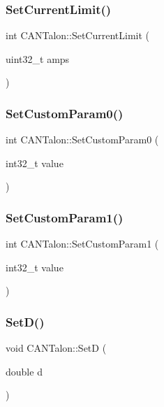 \subsubsection{\texorpdfstring{Set\+Current\+Limit()}{SetCurrentLimit()}}
{\footnotesize\ttfamily int C\+A\+N\+Talon\+::\+Set\+Current\+Limit (\begin{DoxyParamCaption}\item[{uint32\+\_\+t}]{amps }\end{DoxyParamCaption})}

\mbox{\label{class_c_a_n_talon_ab038dcd862b9a130ce6b0c12748e82c5}} 
\subsubsection{\texorpdfstring{Set\+Custom\+Param0()}{SetCustomParam0()}}
{\footnotesize\ttfamily int C\+A\+N\+Talon\+::\+Set\+Custom\+Param0 (\begin{DoxyParamCaption}\item[{int32\+\_\+t}]{value }\end{DoxyParamCaption})}

\mbox{\label{class_c_a_n_talon_af311f483988bfb13d4b5675d13a5c44a}} 
\subsubsection{\texorpdfstring{Set\+Custom\+Param1()}{SetCustomParam1()}}
{\footnotesize\ttfamily int C\+A\+N\+Talon\+::\+Set\+Custom\+Param1 (\begin{DoxyParamCaption}\item[{int32\+\_\+t}]{value }\end{DoxyParamCaption})}

\mbox{\label{class_c_a_n_talon_ad1d9dc5cb06e4efbf57ed10d91f2ee80}} 
\subsubsection{\texorpdfstring{Set\+D()}{SetD()}}
{\footnotesize\ttfamily void C\+A\+N\+Talon\+::\+SetD (\begin{DoxyParamCaption}\item[{double}]{d }\end{DoxyParamCaption})\hspace{0.3cm}{\ttfamily [override]}}

